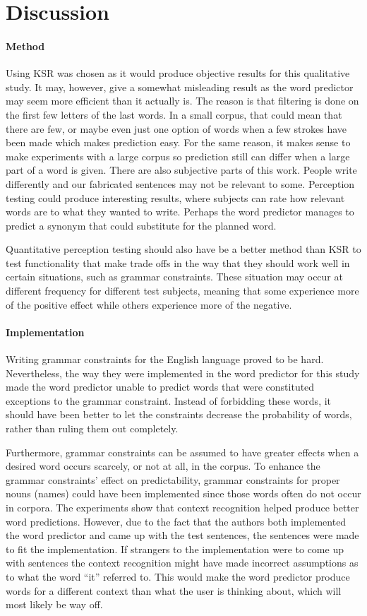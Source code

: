 \section{Discussion}

\paragraph{Method}
Using KSR was chosen as it would produce objective results for this qualitative study. It may, however, give a somewhat misleading result as the word predictor may seem more efficient than it actually is. The reason is that filtering is done on the first few letters of the last words. In a small corpus, that could mean that there are few, or maybe even just one option of words when a few strokes have been made which makes prediction easy. For the same reason, it makes sense to make experiments with a large corpus so prediction still can differ when a large part of a word is given. There are also subjective parts of this work. People write differently and our fabricated sentences may not be relevant to some. Perception testing could produce interesting results, where subjects can rate how relevant words are to what they wanted to write. Perhaps the word predictor manages to predict a synonym that could substitute for the planned word.

Quantitative perception testing should also have be a better method than KSR to test functionality that make trade offs in the way that they should work well in certain situations, such as grammar constraints. These situation may occur at different frequency for different test subjects, meaning that some experience more of the positive effect while others experience more of the negative.

\paragraph{Implementation}
Writing grammar constraints for the English language proved to be hard. Nevertheless, the way they were implemented in the word predictor for this study made the word predictor unable to predict words that were constituted exceptions to the grammar constraint. Instead of forbidding these words, it should have been better to let the constraints decrease the probability of words, rather than ruling them out completely.

Furthermore, grammar constraints can be assumed to have greater effects when a desired word occurs scarcely, or not at all, in the corpus. To enhance the grammar constraints’ effect on predictability, grammar constraints for proper nouns (names) could have been implemented since those words often do not occur in corpora.
The experiments show that context recognition helped produce better word predictions. However, due to the fact that the authors both implemented the word predictor and came up with the test sentences, the sentences were made to fit the implementation. If strangers to the implementation were to come up with sentences the context recognition might have made incorrect assumptions as to what the word “it” referred to. This would make the word predictor produce words for a different context than what the user is thinking about, which will most likely be way off.

